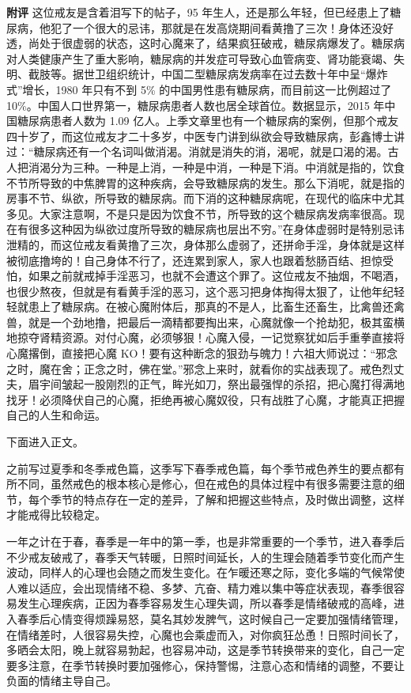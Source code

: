 \begin{case}
    \textbf{附评} 这位戒友是含着泪写下的帖子，95 年生人，还是那么年轻，但已经患上了糖尿病，他犯了一个很大的忌讳，那就是在发高烧期间看黄撸了三次！身体还没好透，尚处于很虚弱的状态，这时心魔来了，结果疯狂破戒，糖尿病爆发了。糖尿病对人类健康产生了重大影响，糖尿病的并发症可导致心血管病变、肾功能衰竭、失明、截肢等。据世卫组织统计，中国二型糖尿病发病率在过去数十年中呈“爆炸式”增长，1980 年只有不到 5\% 的中国男性患有糖尿病，而目前这一比例超过了 10\%。中国人口世界第一，糖尿病患者人数也居全球首位。数据显示，2015 年中国糖尿病患者人数为 1.09 亿人。上季文章里也有一个糖尿病的案例，但那个戒友四十岁了，而这位戒友才二十多岁，中医专门讲到纵欲会导致糖尿病，彭鑫博士讲过：“糖尿病还有一个名词叫做消渴。消就是消失的消，渴呢，就是口渴的渴。古人把消渴分为三种。一种是上消，一种是中消，一种是下消。中消就是指的，饮食不节所导致的中焦脾胃的这种疾病，会导致糖尿病的发生。那么下消呢，就是指的房事不节、纵欲，所导致的糖尿病。而下消的这种糖尿病呢，在现代的临床中尤其多见。大家注意啊，不是只是因为饮食不节，所导致的这个糖尿病发病率很高。现在有很多这种因为纵欲过度所导致的糖尿病也层出不穷。”在身体虚弱时是特别忌讳泄精的，而这位戒友看黄撸了三次，身体那么虚弱了，还拼命手淫，身体就是这样被彻底撸垮的！自己身体不行了，还连累到家人，家人也跟着愁肠百结、担惊受怕，如果之前就戒掉手淫恶习，也就不会遭这个罪了。这位戒友不抽烟，不喝酒，也很少熬夜，但就是有看黄手淫的恶习，这个恶习把身体掏得太狠了，让他年纪轻轻就患上了糖尿病。在被心魔附体后，那真的不是人，比畜生还畜生，比禽兽还禽兽，就是一个劲地撸，把最后一滴精都要掏出来，心魔就像一个抢劫犯，极其蛮横地掠夺肾精资源。对付心魔，必须够狠！心魔入侵，一记觉察犹如后手重拳直接将心魔撂倒，直接把心魔 KO！要有这种断念的狠劲与魄力！六祖大师说过：“邪念之时，魔在舍；正念之时，佛在堂。”邪念上来时，就看你的实战表现了。戒色烈丈夫，眉宇间皱起一股刚烈的正气，眸光如刀，祭出最强悍的杀招，把心魔打得满地找牙！必须降伏自己的心魔，拒绝再被心魔奴役，只有战胜了心魔，才能真正把握自己的人生和命运。
\end{case}

下面进入正文。

之前写过夏季和冬季戒色篇，这季写下春季戒色篇，每个季节戒色养生的要点都有所不同，虽然戒色的根本核心是修心，但在戒色的具体过程中有很多需要注意的细节，每个季节的特点存在一定的差异，了解和把握这些特点，及时做出调整，这样才能戒得比较稳定。

一年之计在于春，春季是一年中的第一季，也是非常重要的一个季节，进入春季后不少戒友破戒了，春季天气转暖，日照时间延长，人的生理会随着季节变化而产生波动，同样人的心理也会随之而发生变化。在乍暖还寒之际，变化多端的气候常使人难以适应，会出现情绪不稳、多梦、亢奋、精力难以集中等症状表现，春季很容易发生心理疾病，正因为春季容易发生心理失调，所以春季是情绪破戒的高峰，进入春季后心情变得烦躁易怒，莫名其妙发脾气，这时候自己一定要加强情绪管理，在情绪差时，人很容易失控，心魔也会乘虚而入，对你疯狂怂恿！日照时间长了，多晒会太阳，晚上就容易勃起，也容易冲动，这是季节转换带来的变化，自己一定要多注意，在季节转换时要加强修心，保持警惕，注意心态和情绪的调整，不要让负面的情绪主导自己。

